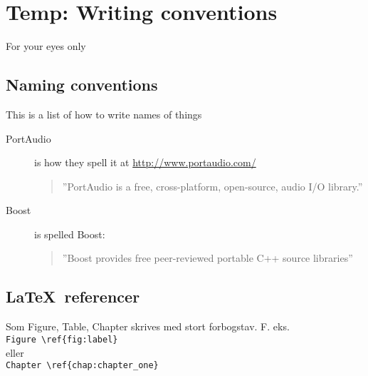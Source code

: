 \chapter*{Temp: Writing conventions}
For your eyes only
\section*{Naming conventions}
This is a list of how to write names of things

\begin{description}
  \item[PortAudio] is how they spell it at \url{http://www.portaudio.com/} \begin{quote}''PortAudio is a free, cross-platform, open-source, audio I/O library.''\end{quote}
  \item[Boost] is spelled Boost: \begin{quote}''Boost provides free peer-reviewed portable C++ source libraries''\end{quote}
\end{description}

\section*{\LaTeX\ referencer}
Som Figure, Table, Chapter skrives med stort forbogstav. F. eks. \\ \verb|Figure \ref{fig:label}|\\ eller \\ \verb|Chapter \ref{chap:chapter_one}|